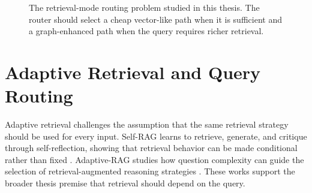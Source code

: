 \documentclass[english, bibtex]{kththesis}               %
\numberwithin{listing}{chapter}
\begin{document}
\begin{figure}[!ht]
\centering
{}
\caption{The retrieval-mode routing problem studied in this thesis. The router should select a cheap vector-like path when it is sufficient and a graph-enhanced path when the query requires richer retrieval.}
\label{fig:retrievalModeRouting}
\end{figure}

\section{Adaptive Retrieval and Query Routing}
\label{sec:backgroundAdaptiveRetrieval}

Adaptive retrieval challenges the assumption that the same retrieval strategy should be used for every input. Self-RAG learns to retrieve, generate, and critique through self-reflection, showing that retrieval behavior can be made conditional rather than fixed \cite{asai2023selfrag}. Adaptive-RAG studies how question complexity can guide the selection of retrieval-augmented reasoning strategies \cite{jeong2024adaptiverag}. These works support the broader thesis premise that retrieval should depend on the query.
\end{document}
